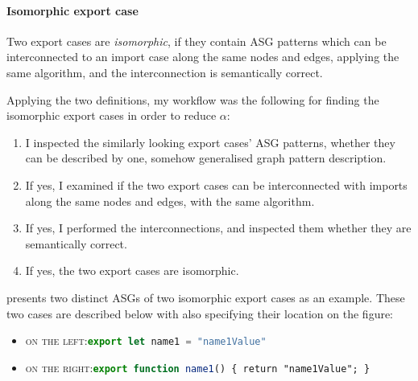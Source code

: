 \paragraph{Isomorphic export case}

Two export cases are \emph{isomorphic}, if they contain ASG patterns which can be interconnected to an import case along the same nodes and edges, applying the same algorithm, and the interconnection is semantically correct.

Applying the two definitions, my workflow was the following for finding the isomorphic export cases in order to reduce $\alpha$:

\begin{enumerate}
\item I inspected the similarly looking export cases' ASG patterns, whether they can be described by one, somehow generalised graph pattern description.
\item If yes, I examined if the two export cases can be interconnected with imports along the same nodes and edges, with the same algorithm.
\item If yes, I performed the interconnections, and inspected them whether they are semantically correct.
\item If yes, the two export cases are isomorphic.
\end{enumerate}

 presents two distinct ASGs of two isomorphic export cases as an example. These two cases are described below with also specifying their location on the figure:
\begin{itemize}
\item \textsc{on the left:}\enskip\lstinline[language=JavaScript]{export let name1 = "name1Value"}
\item \textsc{on the right:}\enskip\lstinline[language=JavaScript]{export function name1()}\texttt{ \{ }\lstinline{return "name1Value";}\texttt{ \}}
\end{itemize}

